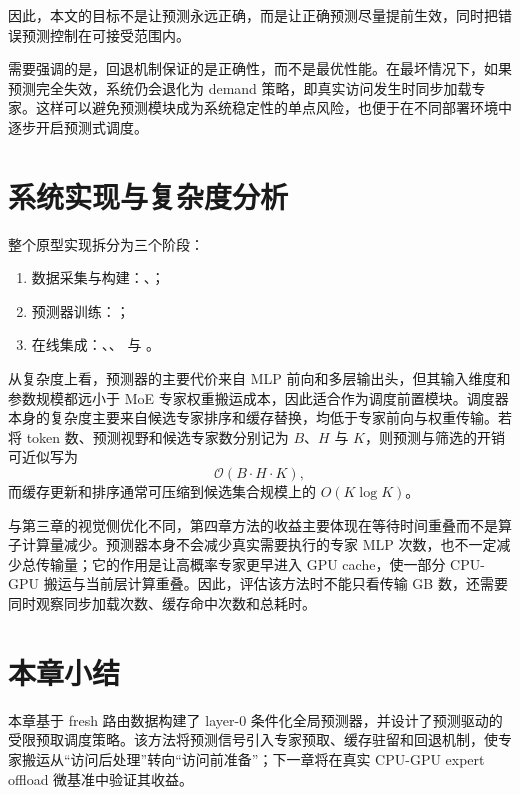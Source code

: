 因此，本文的目标不是让预测永远正确，而是让正确预测尽量提前生效，同时把错误预测控制在可接受范围内。

需要强调的是，回退机制保证的是正确性，而不是最优性能。在最坏情况下，如果预测完全失效，系统仍会退化为 demand 策略，即真实访问发生时同步加载专家。这样可以避免预测模块成为系统稳定性的单点风险，也便于在不同部署环境中逐步开启预测式调度。

\section{系统实现与复杂度分析}
整个原型实现拆分为三个阶段：
\begin{enumerate}
    \item 数据采集与构建：、；
    \item 预测器训练：；
    \item 在线集成：、、 与 。
\end{enumerate}

从复杂度上看，预测器的主要代价来自 MLP 前向和多层输出头，但其输入维度和参数规模都远小于 MoE 专家权重搬运成本，因此适合作为调度前置模块。调度器本身的复杂度主要来自候选专家排序和缓存替换，均低于专家前向与权重传输。若将 token 数、预测视野和候选专家数分别记为 $B$、$H$ 与 $K$，则预测与筛选的开销可近似写为
\begin{equation}
\mathcal{O}(B \cdot H \cdot K),
\end{equation}
而缓存更新和排序通常可压缩到候选集合规模上的 $O(K\log K)$。

与第三章的视觉侧优化不同，第四章方法的收益主要体现在等待时间重叠而不是算子计算量减少。预测器本身不会减少真实需要执行的专家 MLP 次数，也不一定减少总传输量；它的作用是让高概率专家更早进入 GPU cache，使一部分 CPU-GPU 搬运与当前层计算重叠。因此，评估该方法时不能只看传输 GB 数，还需要同时观察同步加载次数、缓存命中次数和总耗时。

\section{本章小结}
本章基于 fresh 路由数据构建了 layer-0 条件化全局预测器，并设计了预测驱动的受限预取调度策略。该方法将预测信号引入专家预取、缓存驻留和回退机制，使专家搬运从“访问后处理”转向“访问前准备”；下一章将在真实 CPU-GPU expert offload 微基准中验证其收益。
